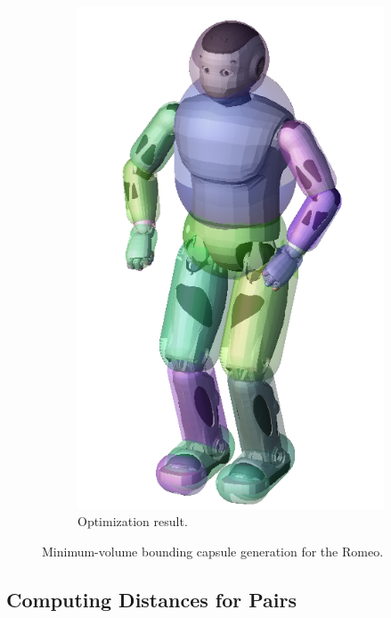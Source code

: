 \begin{figure}
\begin{subfigure}{0.24\columnwidth}
    \includegraphics[width = \columnwidth]
                    {src/chap3-optimal-motion-planning/figure/romeo-capsule.png}
    \caption{Optimization result.}
    \label{simple-path-sol-shortcutb}
  \end{subfigure}
  \caption{Minimum-volume bounding capsule generation for the Romeo.}
  \label{fig:chap3-romeo-capsule}
\end{figure}

\subsection{Computing Distances for Pairs}

